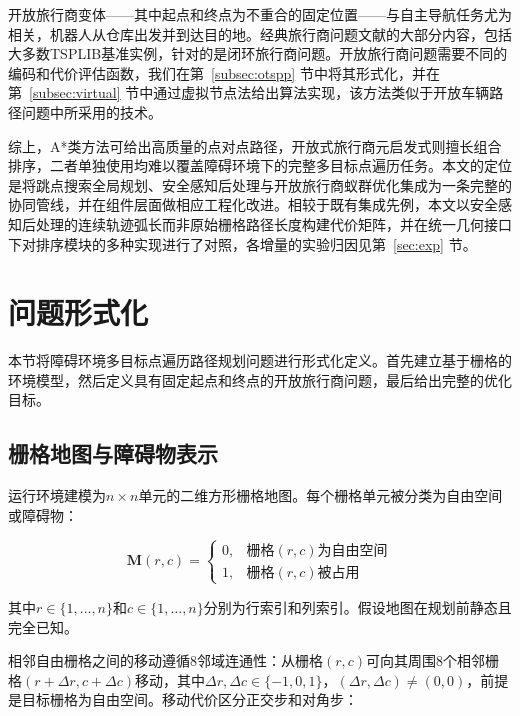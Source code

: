 \documentclass[lettersize,journal]{IEEEtran}
\begin{document}
开放旅行商变体——其中起点和终点为不重合的固定位置——与自主导航任务尤为相关，机器人从仓库出发并到达目的地。经典旅行商问题文献的大部分内容，包括大多数TSPLIB基准实例，针对的是闭环旅行商问题。开放旅行商问题需要不同的编码和代价评估函数，我们在第~\textcolor{blue}{\ref{subsec:otspp}} 节中将其形式化，并在第~\textcolor{blue}{\ref{subsec:virtual}} 节中通过虚拟节点法给出算法实现，该方法类似于开放车辆路径问题中所采用的技术\textcolor{blue}{\cite{ref31,ref32}}。

综上，A*类方法可给出高质量的点对点路径，开放式旅行商元启发式则擅长组合排序，二者单独使用均难以覆盖障碍环境下的完整多目标点遍历任务。本文的定位是将跳点搜索全局规划、安全感知后处理与开放旅行商蚁群优化集成为一条完整的协同管线，并在组件层面做相应工程化改进。相较于既有集成先例\textcolor{blue}{\cite{ref1,ref2}}，本文以安全感知后处理的连续轨迹弧长而非原始栅格路径长度构建代价矩阵，并在统一几何接口下对排序模块的多种实现进行了对照，各增量的实验归因见第~\textcolor{blue}{\ref{sec:exp}} 节。

\section{问题形式化}

\label{sec:form}

本节将障碍环境多目标点遍历路径规划问题进行形式化定义。首先建立基于栅格的环境模型，然后定义具有固定起点和终点的开放旅行商问题，最后给出完整的优化目标。

\subsection{栅格地图与障碍物表示}

运行环境建模为$n \times n$单元的二维方形栅格地图。每个栅格单元被分类为自由空间或障碍物：

\begin{equation}
\mathbf{M}(r, c) =
\begin{cases}
0, & \text{栅格}(r, c)\text{为自由空间} \\
1, & \text{栅格}(r, c)\text{被占用}
\end{cases}
\label{eq:map}
\end{equation}

其中$r \in \{1, \dots, n\}$和$c \in \{1, \dots, n\}$分别为行索引和列索引。假设地图在规划前静态且完全已知。

相邻自由栅格之间的移动遵循8邻域连通性：从栅格$(r, c)$可向其周围8个相邻栅格$(r + \Delta r, c + \Delta c)$移动，其中$\Delta r, \Delta c \in \{-1, 0, 1\}$，$(\Delta r, \Delta c) \neq (0, 0)$，前提是目标栅格为自由空间。移动代价区分正交步和对角步：
\end{document}
